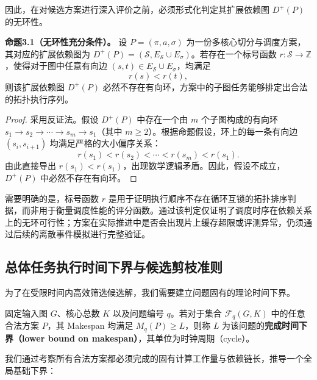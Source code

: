 \documentclass[anonymous,notoc]{gmcm2026}
\begin{document}
因此，在对候选方案进行深入评价之前，必须形式化判定其扩展依赖图 \(D^+(P)\) 的无环性。

\textbf{命题3.1（无环性充分条件）。} 设 \(P = (\pi, a, \sigma)\) 为一份多核心切分与调度方案，其对应的扩展依赖图为 \(D^+(P) = (\mathcal{S}, E_{\mathcal{S}} \cup E_\sigma)\)。若存在一个标号函数 \(r: \mathcal{S} \to \mathbb{Z}\)，使得对于图中任意有向边 \((s, t) \in E_{\mathcal{S}} \cup E_\sigma\)，均满足 \[r(s) < r(t),\] 则该扩展依赖图 \(D^+(P)\) 必然不存在有向环，方案中的子图任务能够排定出合法的拓扑执行序列。

\begin{proof} 采用反证法。假设 \(D^+(P)\) 中存在一个由 \(m\) 个子图构成的有向环 \(s_1 \to s_2 \to \cdots \to s_m \to s_1\)（其中 \(m \ge 2\)）。根据命题假设，环上的每一条有向边 \((s_i, s_{i+1})\) 均满足严格的大小偏序关系： \[r(s_1) < r(s_2) < \cdots < r(s_m) < r(s_1).\] 由此直接导出 \(r(s_1) < r(s_1)\)，出现数学逻辑矛盾。因此，假设不成立，\(D^+(P)\) 中必然不存在有向环。 \end{proof}

需要明确的是，标号函数 \(r\) 是用于证明执行顺序不存在循环互锁的拓扑排序判据，而非用于衡量调度性能的评分函数。通过该判定仅证明了调度时序在依赖关系上的无环可行性；方案在实际推进中是否会出现片上缓存超限或评测异常，仍须通过后续的离散事件模拟进行完整验证。

\subsection{总体任务执行时间下界与候选剪枝准则}

为了在受限时间内高效筛选候选解，我们需要建立问题固有的理论时间下界。

固定输入图 \(G\)、核心总数 \(K\) 以及问题编号 \(q\)。若对于集合 \(\mathcal{F}_q(G, K)\) 中的任意合法方案 \(P\)，其 Makespan 均满足 \(M_q(P) \ge L\)，则称 \(L\) 为该问题的\textbf{完成时间下界（lower bound on makespan）}，其单位为时钟周期（cycle）。

我们通过考察所有合法方案都必须完成的固有计算工作量与依赖链长，推导一个全局基础下界：
\end{document}
